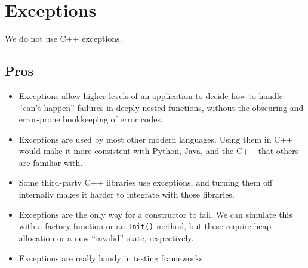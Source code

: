 
\section{Exceptions}\label{sec:exceptions}
We do not use C++ exceptions.
\subsection{Pros}
\begin{itemize}
    \item Exceptions allow higher levels of an application to decide how to handle \enquote{can't happen} failures in deeply nested functions, without the obscuring and error-prone bookkeeping of error codes.
    \item Exceptions are used by most other modern languages. Using them in C++ would make it more consistent with Python, Java, and the C++ that others are familiar with.
    \item Some third-party C++ libraries use exceptions, and turning them off internally makes it harder to integrate with those libraries.
    \item Exceptions are the only way for a constructor to fail. We can simulate this with a factory function or an \texttt{Init()} method, but these require heap allocation or a new \enquote{invalid} state, respectively.
    \item Exceptions are really handy in testing frameworks.
\end{itemize}

